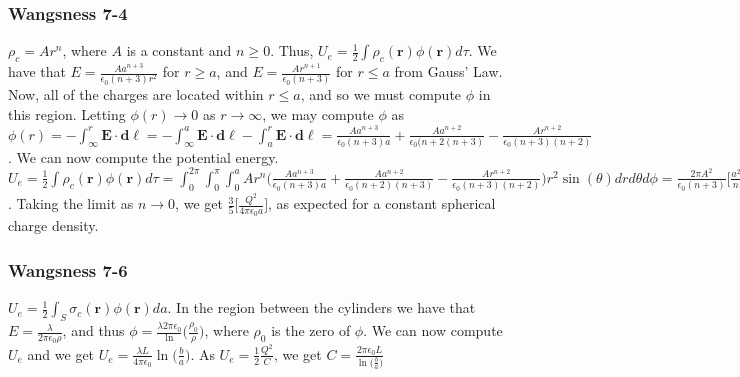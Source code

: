 \documentclass[crop=false,class=book,oneside]{standalone}
\begin{document}
            \subsubsection{Wangsness 7-4}
                $\rho_c = Ar^n$, where $A$ is a constant and $n\geq 0$.
                Thus, $U_e=\frac{1}{2}\int\rho_c(\mathbf{r})\phi(\mathbf{r})d\tau$.
                We have that $E=\frac{Aa^{n+3}}{\epsilon_0 (n+3)r^2}$
                for $r\geq a$, and $E=\frac{Ar^{n+1}}{\epsilon_0(n+3)}$ for
                $r\leq a$ from Gauss' Law. Now, all of the charges are located within
                $r\leq a$, and so we must compute $\phi$ in this region.
                Letting $\phi(r)\rightarrow 0$ as $r\rightarrow \infty$,
                we may compute $\phi$ as
                $\phi(r)=-\int_{\infty}^{r}\mathbf{E}\cdot\mathbf{d\ell}=-\int_{\infty}^{a}\mathbf{E}\cdot\mathbf{d\ell}- \int_{a}^{r}\mathbf{E}\cdot \mathbf{d\ell}= \frac{Aa^{n+3}}{\epsilon_0(n+3)a}+\frac{Aa^{n+2}}{\epsilon_0(n+2(n+3)}-\frac{Ar^{n+2}}{\epsilon_0(n+3)(n+2)}$.
                We can now compute the potential energy.
                $U_e=\frac{1}{2}\int\rho_c(\mathbf{r})\phi(\mathbf{r})d\tau=\int_{0}^{2\pi}\int_{0}^{\pi}\int_{0}^{a}Ar^n \bigg(\frac{Aa^{n+3}}{\epsilon_0(n+3)a}+\frac{Aa^{n+2}}{\epsilon_0(n+2)(n+3)}-\frac{Ar^{n+2}}{\epsilon_0(n+3)(n+2)}\bigg)r^2 \sin(\theta)dr d\theta d\phi = \frac{2\pi A^2}{\epsilon_0 (n+3)}\bigg[\frac{a^{2n+5}}{n+3}+\frac{a^{2n+5}}{(n+2)(n+3)}-\frac{a^{2n+5}}{(n+2)(2n+5)}\bigg]$.
                Taking the limit as $n\rightarrow 0$, we get $\frac{3}{5}\bigg[\frac{Q^2}{4\pi \epsilon_0 a}\bigg]$,
                as expected for a constant spherical charge density.
            \subsubsection{Wangsness 7-6}
                $U_e = \frac{1}{2}\int_{S}\sigma_c(\mathbf{r})\phi(\mathbf{r})da$.
                In the region between the cylinders we have that
                $E=\frac{\lambda}{2\pi\epsilon_0\rho}$, and thus
                $\phi= \frac{\lambda 2\pi \epsilon_0}\ln\big(\frac{\rho_0}{\rho}\big)$,
                where $\rho_0$ is the zero of $\phi$. We can now compute $U_e$
                and we get $U_e = \frac{\lambda L}{4\pi\epsilon_0}\ln\big(\frac{b}{a}\big)$.
                As $U_e = \frac{1}{2}\frac{Q^2}{C}$, we get
                $C=\frac{2\pi \epsilon_0 L}{\ln\big(\frac{b}{a}\big)}$
\end{document}
